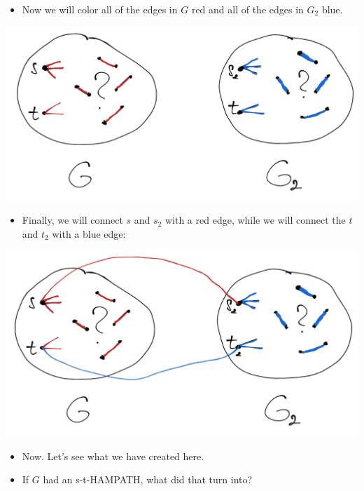 \begin{itemize}
    \item Now we will color all of the edges in $G$ red and all of the edges in $G_2$ blue. 
\end{itemize}

\begin{center}
\includegraphics[width=0.9\linewidth]{./exams/2022_05_30/03/karp_2.png}
\end{center}

\begin{itemize}
    \item Finally, we will connect $s$ and $s_2$ with a red edge, while we will connect the $t$ and $t_2$ with a blue edge:
\end{itemize}

\begin{center}
\includegraphics[width=0.9\linewidth]{./exams/2022_05_30/03/karp_3.png}
\end{center}

\begin{itemize}
    \item Now. Let's see what we have created here.
    \item If $G$ had an s-t-HAMPATH, what did that turn into?
\end{itemize}


